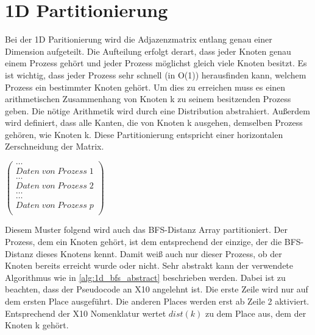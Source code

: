 

\section{1D Partitionierung} %
\label{sec:1d_partitionierung}
Bei der 1D Paritionierung wird die Adjazenzmatrix entlang genau einer Dimension aufgeteilt. Die Aufteilung erfolgt derart, dass jeder Knoten genau einem Prozess gehört und jeder Prozess möglichst gleich viele Knoten besitzt. Es ist wichtig, dass jeder Prozess sehr schnell (in O(1)) herausfinden kann, welchem Prozess ein bestimmter Knoten gehört. Um dies zu erreichen muss es einen arithmetischen Zusammenhang von Knoten k zu seinem besitzenden Prozess geben. Die nötige Arithmetik wird durch eine Distribution abstrahiert. Außerdem wird definiert, dass alle Kanten, die von Knoten k ausgehen, demselben Prozess gehören, wie Knoten k. Diese Partitionierung entspricht einer horizontalen Zerschneidung der Matrix.

\begin{center}
$\left( \begin{array}{c}
	\dots \\ Daten\;von\;Prozess\;1 \\	\hline
	\dots \\ Daten\;von\;Prozess\;2 \\	\hline
	\dots \\	\hline
	\dots \\ Daten\;von\;Prozess\;p \\
\end{array} \right)$
\end{center}

Diesem Muster folgend wird auch das BFS-Distanz Array partitioniert. Der Prozess, dem ein Knoten gehört, ist dem entsprechend der einzige, der die BFS-Distanz dieses Knotens kennt. Damit weiß auch nur dieser Prozess, ob der Knoten bereits erreicht wurde oder nicht. Sehr abstrakt kann der verwendete Algorithmus wie in \ref{alg:1d_bfs_abstract} beschrieben werden. Dabei ist zu beachten, dass der Pseudocode an X10 angelehnt ist. Die erste Zeile wird nur auf dem ersten Place ausgeführt. Die anderen Places werden erst ab Zeile 2 aktiviert. Entsprechend der X10 Nomenklatur wertet $dist(k)$ zu dem Place aus, dem der Knoten k gehört.

